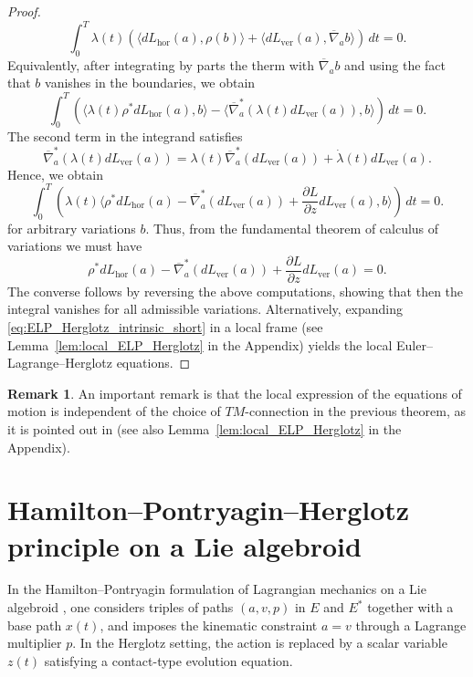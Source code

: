 \documentclass[11pt,a4paper]{article}
\theoremstyle{definition}
\newtheorem{remark}[theorem]{Remark}
\begin{document}
\begin{proof}
\begin{equation*}
\int_0^T \lambda(t)
\left(
\langle dL_{\mathrm{hor}}(a), \rho(b) \rangle + \langle dL_{\mathrm{ver}}(a), \overline{\nabla}_{a} b \rangle
\right) \,dt = 0.
\end{equation*}
Equivalently, after integrating by parts the therm with $\overline{\nabla}_{a} b$ and using the fact that $b$ vanishes in the boundaries, we obtain
\[
\int_0^T \left(
\langle \lambda(t)\rho^{*}dL_{\mathrm{hor}}(a), b \rangle - \langle \overline{\nabla}_{a}^{*}\left(\lambda(t)dL_{\mathrm{ver}}(a)\right),  b \rangle
\right) \,dt = 0.
\]
The second term in the integrand satisfies
$$\overline{\nabla}_{a}^{*}\left(\lambda(t)dL_{\mathrm{ver}}(a)\right) = \lambda(t)\overline{\nabla}_{a}^{*}\left(dL_{\mathrm{ver}}(a)\right)  +\dot{\lambda}(t) dL_{\mathrm{ver}}(a).$$
Hence, we obtain
\[
\int_0^T \left(
\lambda(t)\langle \rho^{*}dL_{\mathrm{hor}}(a) -\overline{\nabla}_{a}^{*}\left(dL_{\mathrm{ver}}(a)\right) + \frac{\partial L}{\partial z} dL_{\mathrm{ver}}(a),  b \rangle
\right) \,dt = 0.
\]
for arbitrary variations $b$. Thus, from the fundamental theorem of calculus of variations we must have
$$\rho^{*}dL_{\mathrm{hor}}(a) - \overline{\nabla}_{a}^{*}\left(dL_{\mathrm{ver}}(a)\right) + \frac{\partial L}{\partial z} dL_{\mathrm{ver}}(a) = 0.$$
The converse follows by reversing the above computations, showing that then
the integral vanishes for all admissible variations.
Alternatively, expanding \eqref{eq:ELP_Herglotz_intrinsic_short} in a local
frame (see Lemma~\ref{lem:local_ELP_Herglotz} in the Appendix) yields the
local Euler--Lagrange--Herglotz equations.  
\end{proof}

\begin{remark}
    An important remark is that the local expression of the equations of motion is independent of the choice of $TM$-connection in the previous theorem, as it is pointed out in \cite{hu2024hamiltonian} (see also Lemma~\ref{lem:local_ELP_Herglotz} in the Appendix).
\end{remark}

\section{Hamilton--Pontryagin--Herglotz principle on a Lie algebroid}
\label{sec:HPH}

In the Hamilton--Pontryagin formulation of Lagrangian mechanics on a Lie
algebroid \cite{li2017lagrangian}, one considers triples of paths
$(a,v,p)$ in $E$ and $E^*$ together with a base path $x(t)$, and imposes
the kinematic constraint $a=v$ through a Lagrange multiplier $p$.
In the Herglotz setting, the action is replaced by a scalar variable
$z(t)$ satisfying a contact-type evolution equation.
\end{document}
